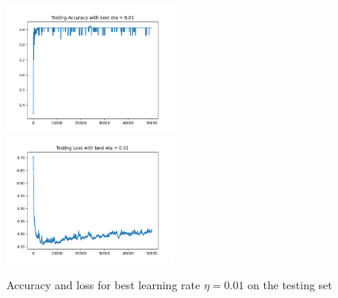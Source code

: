 \documentclass{article}
\begin{document}
\begin{figure}[htbp]
  \includegraphics[width=0.5\textwidth]{../image/testing_acc.png}
  \includegraphics[width=0.5\textwidth]{../image/testing_loss.png}
  \caption{Accuracy and loss for best learning rate $\eta=0.01$ on the testing set}
\label{fig:test}
\end{figure}
\end{document}
